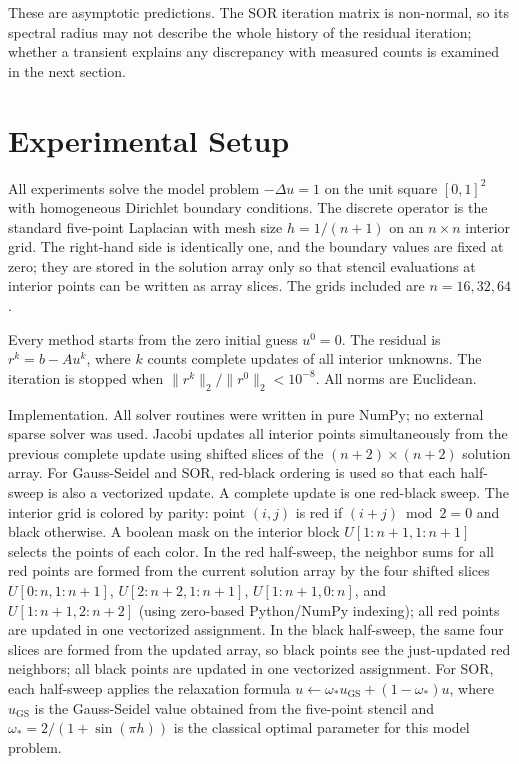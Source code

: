\documentclass[11pt]{article}
\begin{document}
These are asymptotic predictions. The SOR iteration matrix is non-normal, so its spectral radius may not describe the whole history of the residual iteration; whether a transient explains any discrepancy with measured counts is examined in the next section.
\section{Experimental Setup}
All experiments solve the model problem $-\Delta u = 1$ on the unit square $[0,1]^2$ with homogeneous Dirichlet boundary conditions. The discrete operator is the standard five-point Laplacian with mesh size $h = 1/(n+1)$ on an $n \times n$ interior grid. The right-hand side is identically one, and the boundary values are fixed at zero; they are stored in the solution array only so that stencil evaluations at interior points can be written as array slices. The grids included are $n = 16, 32, 64$.

Every method starts from the zero initial guess $u^0 = 0$. The residual is $r^k = b - A u^k$, where $k$ counts complete updates of all interior unknowns. The iteration is stopped when $\|r^k\|_2 / \|r^0\|_2 < 10^{-8}$. All norms are Euclidean.

Implementation. All solver routines were written in pure NumPy; no external sparse solver was used. Jacobi updates all interior points simultaneously from the previous complete update using shifted slices of the $(n+2)\times(n+2)$ solution array. For Gauss-Seidel and SOR, red-black ordering is used so that each half-sweep is also a vectorized update. A complete update is one red-black sweep. The interior grid is colored by parity: point $(i,j)$ is red if $(i+j) \bmod 2 = 0$ and black otherwise. A boolean mask on the interior block $U[1:n+1,1:n+1]$ selects the points of each color. In the red half-sweep, the neighbor sums for all red points are formed from the current solution array by the four shifted slices $U[0:n,1:n+1]$, $U[2:n+2,1:n+1]$, $U[1:n+1,0:n]$, and $U[1:n+1,2:n+2]$ (using zero-based Python/NumPy indexing); all red points are updated in one vectorized assignment. In the black half-sweep, the same four slices are formed from the updated array, so black points see the just-updated red neighbors; all black points are updated in one vectorized assignment. For SOR, each half-sweep applies the relaxation formula $u \leftarrow \omega_* u_{\mathrm{GS}} + (1-\omega_*) u$, where $u_{\mathrm{GS}}$ is the Gauss-Seidel value obtained from the five-point stencil and $\omega_* = 2/(1+\sin(\pi h))$ is the classical optimal parameter for this model problem.
\end{document}
